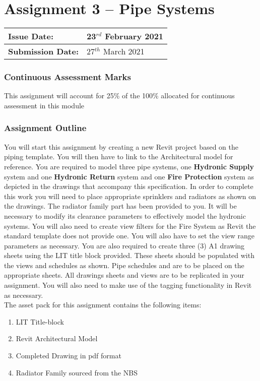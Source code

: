 
	
\part*{Assignment 3 – Pipe Systems}

\begin{tabularx}{\textwidth}{ |X|X| }
	\hline
	\textbf{Issue Date:} & 23$^{rd}$ February 2021 \\
	\hline 
	\textbf{Submission Date:}  & 27$^{th}$ March 2021   \\
	\hline
\end{tabularx}


\section*{Continuous Assessment Marks}
This assignment will account for 25\% of the 100\% allocated for continuous assessment in this module

\section*{Assignment Outline}
You will start this assignment by creating a new Revit project based on the piping template. You will then have to link to the Architectural model for reference.  You are required to model three pipe systems, one \textbf{Hydronic Supply} system and one \textbf{Hydronic Return} system and one \textbf{Fire Protection} system as depicted in the drawings that accompany this specification. In order to complete this work you will need to place appropriate sprinklers and radiators as shown on the drawings. The radiator family part has been provided to you. It will be necessary to modify its clearance parameters to effectively model the hydronic systems.  You will also need to create view filters for the Fire System as Revit the standard template does not provide one. You will also have to set the view range parameters as necessary.  You are also required to create three (3) A1 drawing sheets using the LIT title block provided. These sheets should be populated with the views and schedules as shown.  Pipe schedules and are to be placed on the appropriate sheets. All drawings sheets and views are to be replicated in your assignment. You will also need to make use of the tagging functionality in Revit as necessary.\\

The asset pack for this assignment contains the following items:
\begin{enumerate}
	\item LIT Title-block
	\item Revit Architectural Model
	\item Completed Drawing in pdf format
	\item Radiator Family sourced from the NBS
\end{enumerate}


